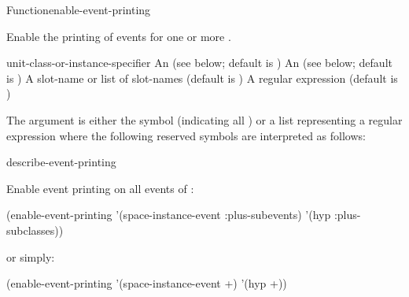 \documentclass[10pt,twoside,english,pdftex]{article}
\begin{document}

\begin{functiondoc}{Function}{enable-event-printing}%
  {\nobr{[\var{event-class-specifier\/}}
    \nobr{[\var{unit-class-or-instance-specifier\/}]]}
    }
%


\fnsyntax

\fnpurpose Enable the printing of events for one or more .

\fnpackage {}

\fnmodule {}

\fnargs
\begin{args}{unit-class-or-instance-specifier}
 An  
(see below; default is )
 An 
(see below; default is )
 A slot-name or list of slot-names
(default is )
 A  regular expression
(default is \code{(*)})
\end{args}

\fndsyntax
\W\supp\tabletop
\eventclassspec
\subeventingspec
\syntaxsep
\unitclassinstancespec
\subclassingspec

\fndescription 
The  argument is either the symbol  (indicating
all ) or a list representing a regular
expression where the following reserved symbols are interpreted as
follows:
\spaceinstanceregexp

\begin{alsos}{describe-event-printing}
\end{alsos}

\fnexample
Enable event printing on all  events of
 :
%
\W\supp
\begin{example}
  (enable-event-printing '(space-instance-event :plus-subevents)
                         '(hyp :plus-subclasses))
\end{example}
%
or simply:
%
\W\supp\notpretop
\begin{example}
  (enable-event-printing '(space-instance-event +) '(hyp +))
\end{example}

\fnnote
\instanceevfnsnyi

\end{functiondoc}
\end{document}
